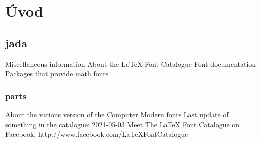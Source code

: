 \chapter{Úvod}
\section{jada}
Miscellaneous information
About the LaTeX Font Catalogue
Font documentation
Packages that provide math fonts
\subsection{parts}
About the various version of the Computer Modern fonts
Last update of something in the catalogue: 2021-05-03
Meet The LaTeX Font Catalogue on Facebook:  http://www.facebook.com/LaTeXFontCatalogue
